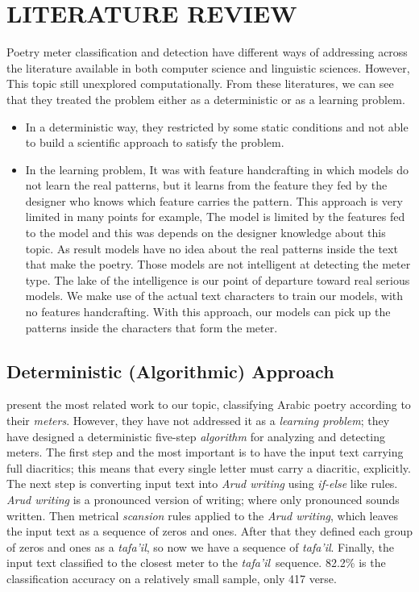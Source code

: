 \chapter{\uppercase{LITERATURE REVIEW}}\label{Ch:Literature}

Poetry meter classification and detection have different ways of addressing across the literature available in both computer science and linguistic sciences. However, This topic still unexplored computationally.
From these literatures, we can see that they treated the problem either as a deterministic or as a learning problem.

\begin{itemize}
  \item In a deterministic way, they restricted by some static conditions and not able to build a scientific approach to satisfy the problem.

\item In the learning problem, It was with feature handcrafting in which models do not learn the real patterns, but it learns from the feature they fed by the designer who knows which feature carries the pattern. This approach is very limited in many points for example, The model is limited by the features fed to the model and this was depends on the designer knowledge about this topic. As result models have no idea about the real patterns inside the text that make the poetry. Those models are not intelligent at detecting the meter type. The lake of the intelligence is our point of departure toward real serious models. We make use of the actual text characters to train our models, with no features handcrafting. With this approach, our models can pick up the patterns inside the characters that form the meter.

\end{itemize}
  
%
\section{Deterministic (Algorithmic) Approach}\label{sec:Determ_Algor_Appr}

\cite{Abuata2016RuleBasedAlgorithmFor} present the most related work to our topic, classifying Arabic poetry according to their \textit{meters}. However, they have not addressed it as a \textit{learning problem}; they have designed a deterministic five-step \textit{algorithm} for analyzing and detecting meters. The first step and the most important is to have the input text carrying full diacritics; this means that every single letter must carry a diacritic, explicitly. The next step is converting input text into \textit{Arud writing} using \textit{if-else} like rules. \textit{Arud writing} is a pronounced version of writing; where only pronounced sounds written. Then metrical \textit{scansion} rules applied to the \textit{Arud writing}, which leaves the input text as a sequence of zeros and ones. After that they defined each group of zeros and ones as a \textit{tafa'il}, so now we have a sequence of \textit{tafa'il}. Finally, the input text classified to the closest meter to the \textit{tafa'il} sequence. 82.2\% is the classification accuracy on a relatively small sample, only 417 verse.

